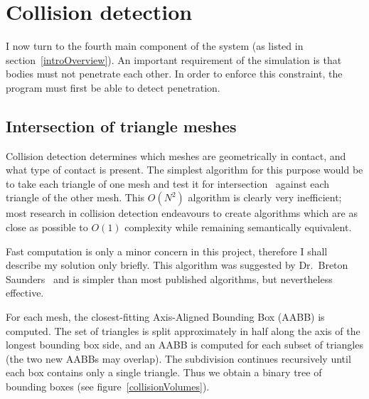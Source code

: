 \section{Collision detection\label{collisionDetection}}

I now turn to the fourth main component of the system (as listed in section~\ref{introOverview}).
An important requirement of the simulation is that bodies must not penetrate each other. In order
to enforce this constraint, the program must first be able to detect penetration.

\subsection{Intersection of triangle meshes\label{meshIntersection}}

Collision detection determines which meshes are geometrically in contact, and what type of contact
is present. The simplest algorithm for this purpose would be to take each triangle
of one mesh and test it for intersection~\cite{Moeller:97} against each triangle of the other
mesh. This $O(N^2)$ algorithm is clearly very inefficient; most research in collision detection
endeavours to create algorithms which are as close as possible to $O(1)$ complexity while
remaining semantically equivalent.

Fast computation is only a minor concern in this project, therefore I shall describe my solution
only briefly. This algorithm was suggested by Dr.~Breton Saunders~\cite{Saunders} and is
simpler than most published algorithms, but nevertheless effective.

For each mesh, the closest-fitting Axis-Aligned Bounding Box (AABB) is computed. The set of
triangles is split approximately in half along the axis of the longest bounding box side, and
an AABB is computed for each subset of triangles (the two new AABBs may overlap). The subdivision
continues recursively until each box contains only a single triangle. Thus we obtain a binary
tree of bounding boxes (see figure~\ref{collisionVolumes}).


